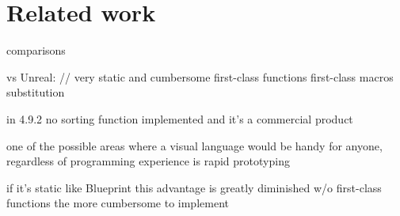 \chapter{Related work}\label{chap:comparison}

comparisons

vs Unreal: // very static and cumbersome
    first-class functions
    first-class macros
    substitution
    
    in 4.9.2 no sorting function implemented
        and it's a commercial product
        
        one of the possible areas where a visual language would be handy for anyone, regardless of programming experience is rapid prototyping
        
        if it's static like Blueprint this advantage is greatly diminished
    w/o first-class functions the more cumbersome to implement